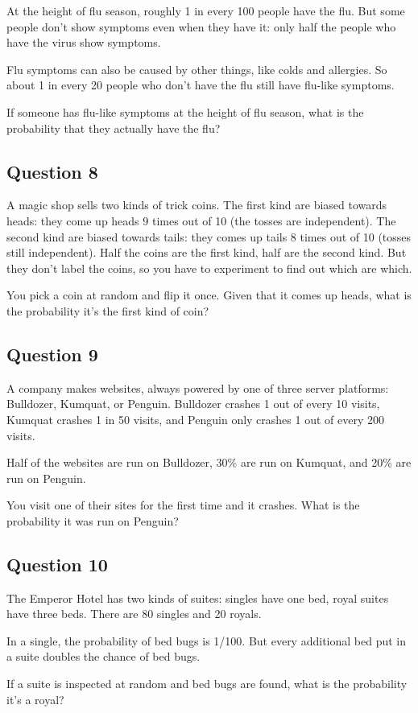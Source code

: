 \documentclass[
  11pt,
]{article}
\begin{document}
At the height of flu season, roughly 1 in every 100 people have the flu.
But some people don't show symptoms even when they have it: only half
the people who have the virus show symptoms.

Flu symptoms can also be caused by other things, like colds and
allergies. So about 1 in every 20 people who don't have the flu still
have flu-like symptoms.

If someone has flu-like symptoms at the height of flu season, what is
the probability that they actually have the flu?

\hypertarget{question-8}{%
\subsection{Question 8}\label{question-8}}

A magic shop sells two kinds of trick coins. The first kind are biased
towards heads: they come up heads 9 times out of 10 (the tosses are
independent). The second kind are biased towards tails: they comes up
tails 8 times out of 10 (tosses still independent). Half the coins are
the first kind, half are the second kind. But they don't label the
coins, so you have to experiment to find out which are which.

You pick a coin at random and flip it once. Given that it comes up
heads, what is the probability it's the first kind of coin?

\hypertarget{question-9}{%
\subsection{Question 9}\label{question-9}}

A company makes websites, always powered by one of three server
platforms: Bulldozer, Kumquat, or Penguin. Bulldozer crashes 1 out of
every 10 visits, Kumquat crashes 1 in 50 visits, and Penguin only
crashes 1 out of every 200 visits.

Half of the websites are run on Bulldozer, 30\% are run on Kumquat, and
20\% are run on Penguin.

You visit one of their sites for the first time and it crashes. What is
the probability it was run on Penguin?

\hypertarget{question-10}{%
\subsection{Question 10}\label{question-10}}

The Emperor Hotel has two kinds of suites: singles have one bed, royal
suites have three beds. There are 80 singles and 20 royals.

In a single, the probability of bed bugs is 1/100. But every additional
bed put in a suite doubles the chance of bed bugs.

If a suite is inspected at random and bed bugs are found, what is the
probability it's a royal?
\end{document}
